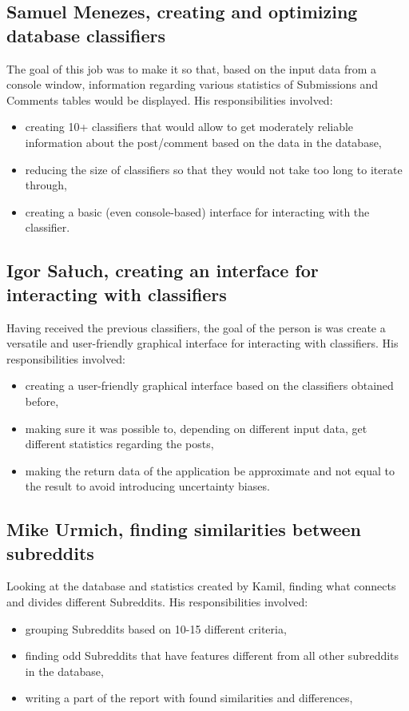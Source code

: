 \documentclass{article}
\begin{document}
\subsection{Samuel Menezes, creating and optimizing database classifiers}
The goal of this job was to make it so that, based on the input data from a console window, information regarding various statistics of Submissions and Comments tables would be displayed. His responsibilities involved:
\begin{itemize}
	\item creating 10+ classifiers that would allow to get moderately reliable information about the post/comment based on the data in the database,
	\item reducing the size of classifiers so that they would not take too long to iterate through,
	\item creating a basic (even console-based) interface for interacting with the classifier.
\end{itemize}

\subsection{Igor Sałuch, creating an interface for interacting with classifiers}
Having received the previous classifiers, the goal of the person is was create a versatile and user-friendly graphical interface for interacting with classifiers. His responsibilities involved:
\begin{itemize}
	\item creating a user-friendly graphical interface based on the classifiers obtained before,
	\item making sure it was possible to, depending on different input data, get different statistics regarding the posts,
	\item making the return data of the application be approximate and not equal to the result to avoid introducing uncertainty biases.
\end{itemize}

\subsection{Mike Urmich, finding similarities between subreddits}
Looking at the database and statistics created by Kamil, finding what connects and divides different Subreddits. His responsibilities involved:
\begin{itemize}
	\item grouping Subreddits based on 10-15 different criteria,
	\item finding odd Subreddits that have features different from all other subreddits in the database,
	\item writing a part of the report with found similarities and differences,
\end{itemize}
\end{document}
